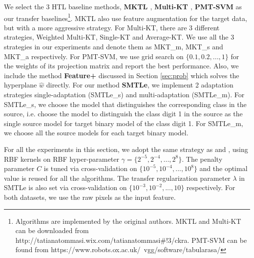 We select the 3 HTL baseline methods, \textbf{MKTL \cite{jie2011multiclass}}, \textbf{Multi-KT \cite{tommasi2014learning}}, \textbf{PMT-SVM} \cite{aytar2011tabula} as our transfer baselines\footnote{Algorithms are implemented by the original authors. MKTL and Multi-KT can be downloaded from http://tatianatommasi.wix.com/tatianatommasi\#!3/ckra. PMT-SVM can be found from https://www.robots.ox.ac.uk/~vgg/software/tabularasa/}. MKTL also use feature augmentation for the target data, but with a more aggressive strategy. For Multi-KT, there are 3 different strategies, Weighted Multi-KT, Single-KT and Average-KT. We use all the 3 strategies in our experiments and denote them as MKT\_m, MKT\_s and MKT\_a respectively. For PMT-SVM, we use grid search on $\{0.1,0.2,...,1\}$ for the weights of its projection matrix and report the best performance.
Also, we include the method \textbf{Feature+} discussed in Section \ref{sec:prob} which solves the hyperplane $\hat{w}$ directly. 
For our method \textbf{SMTLe}, we implement 2 adaptation strategies single-adaptation (SMTLe\_s) and multi-adaptation (SMTLe\_m). For SMTLe\_s, we choose the model that distinguishes the corresponding class in the source, i.e. choose the model to distinguish the class digit 1 in the source as the single source model for target binary model of the class digit 1. For SMTLe\_m, we choose all the source models for each target binary model.





For all the experiments in this section, we adopt the same strategy as \cite{kuzborskij2013n} and \cite{tommasi2014learning}, using RBF kernels on RBF hyper-parameter $\gamma = \{2^{-5},2^{-4},...,2^8\}$. The penalty parameter $C$ is tuned via cross-validation on $\{10^{-5},10^{-4},...,10^8\}$ and the optimal value is reused for all the algorithms. 
The transfer regularization parameter $\lambda$ in SMTLe is also set via cross-validation on $\{10^{-3},10^{-2},...,10\}$ respectively. For both datasets, we use the raw pixels as the input feature.


